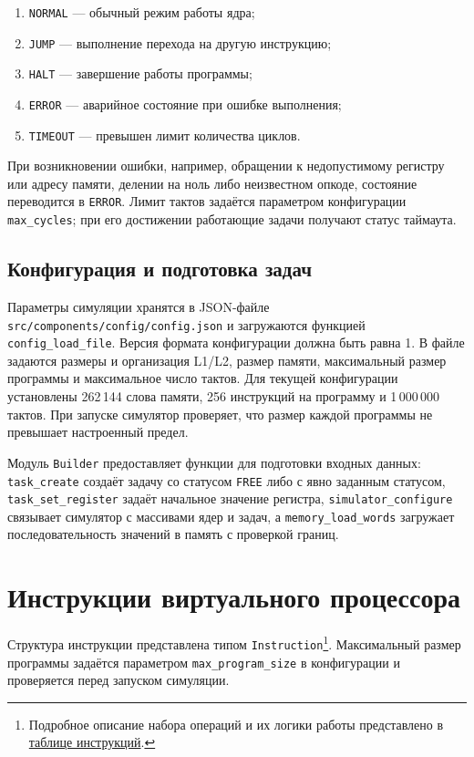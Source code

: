 \documentclass[12pt,a4paper]{article}
\begin{document}
\begin{enumerate}[leftmargin=2em]
    \item \texttt{NORMAL} --- обычный режим работы ядра;
    \item \texttt{JUMP} --- выполнение перехода на другую инструкцию;
    \item \texttt{HALT} --- завершение работы программы;
    \item \texttt{ERROR} --- аварийное состояние при ошибке выполнения;
    \item \texttt{TIMEOUT} --- превышен лимит количества циклов.
\end{enumerate}

При возникновении ошибки, например, обращении к недопустимому регистру или адресу памяти, делении на ноль либо неизвестном опкоде, состояние переводится в \texttt{ERROR}. Лимит тактов задаётся параметром конфигурации \texttt{max\_cycles}; при его достижении работающие задачи получают статус таймаута.

\subsection{Конфигурация и подготовка задач}

Параметры симуляции хранятся в JSON-файле \texttt{src/components/config/config.json} и загружаются функцией \texttt{config\_load\_file}. Версия формата конфигурации должна быть равна 1. В файле задаются размеры и организация L1/L2, размер памяти, максимальный размер программы и максимальное число тактов. Для текущей конфигурации установлены 262\,144 слова памяти, 256 инструкций на программу и 1\,000\,000 тактов. При запуске симулятор проверяет, что размер каждой программы не превышает настроенный предел.

Модуль \texttt{Builder} предоставляет функции для подготовки входных данных: \texttt{task\_create} создаёт задачу со статусом \texttt{FREE} либо с явно заданным статусом, \texttt{task\_set\_register} задаёт начальное значение регистра, \texttt{simulator\_configure} связывает симулятор с массивами ядер и задач, а \texttt{memory\_load\_words} загружает последовательность значений в память с проверкой границ.

\section{Инструкции виртуального процессора}\label{sec:instructions}

Структура инструкции представлена типом \texttt{Instruction}\footnote{Подробное описание набора операций и их логики работы представлено в \hyperref[tab:instructions]{таблице инструкций}.}. Максимальный размер программы задаётся параметром \texttt{max\_program\_size} в конфигурации и проверяется перед запуском симуляции.
\end{document}
